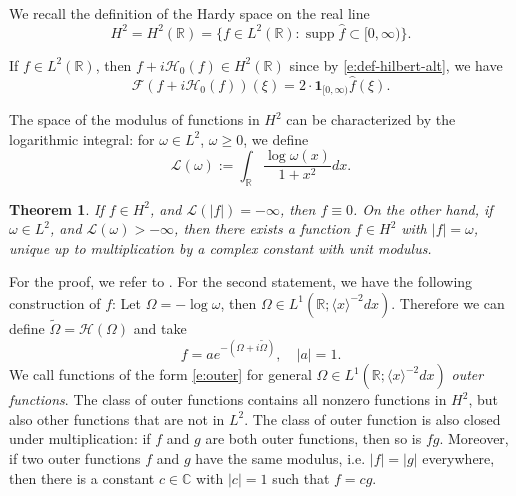 \documentclass[reqno,12pt,letterpaper]{amsart}
\newtheorem{thm}[prop]{Theorem}
\numberwithin{equation}{section}
\numberwithin{prop}{section}
\DeclareMathOperator{\supp}{supp}
\begin{document}
We recall the definition of the Hardy space on the real line
\begin{equation*}
H^2=H^2(\mathbb{R})=\{f\in L^2(\mathbb{R}):\supp\widehat{f}\subset[0,\infty)\}.
\end{equation*}


If $f\in L^2(\mathbb{R})$, then $f+i\mathcal{H}_0(f)\in H^2(\mathbb{R})$ since
by \eqref{e:def-hilbert-alt}, we have 
$$\mathcal{F}(f+i\mathcal{H}_0(f))(\xi)=2\cdot\mathbf{1}_{[0,\infty)}\widehat{f}(\xi).$$


The space of the modulus of functions in $H^2$ can be characterized by the logarithmic integral: for $\omega\in L^2$, $\omega\geq0$, we define
\begin{equation}
\label{e:logint}
\mathcal{L}(\omega):=\int_\mathbb{R}\frac{\log\omega(x)}{1+x^2}dx.
\end{equation}

\begin{thm}
If $f\in H^2$, and $\mathcal{L}(|f|)=-\infty$, then $f\equiv0$. On the other hand, if $\omega\in L^2$, and $\mathcal{L}(\omega)>-\infty$, then there exists a function $f\in H^2$ with $|f|=\omega$, unique up to multiplication by a complex constant with unit modulus.
\end{thm}

For the proof, we refer to \cite[\S 1.5]{up}. For the second statement, we have the following construction of $f$: Let $\Omega=-\log\omega$, then $\Omega\in L^1(\mathbb{R};\langle x\rangle^{-2}dx)$. Therefore we can define $\widetilde{\Omega}=\mathcal{H}(\Omega)$ and take
\begin{equation}
\label{e:outer}
f=ae^{-(\Omega+i\widetilde{\Omega})},\quad |a|=1.
\end{equation}
We call functions of the form \eqref{e:outer} for general $\Omega\in L^1(\mathbb{R};\langle x\rangle^{-2}dx)$ \emph{outer functions}. The class of outer functions contains all nonzero functions in $H^2$, but also other functions that are not in $L^2$. The class of outer function is also closed under multiplication: if $f$ and $g$ are both outer functions, then so is $fg$. Moreover, if two outer functions $f$ and $g$ have the same modulus, i.e. $|f|=|g|$ everywhere, then there is a constant $c\in\mathbb{C}$ with $|c|=1$ such that $f=cg$.
\end{document}
